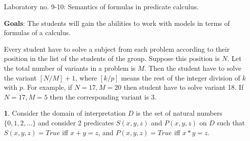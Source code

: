 \documentclass{article}
\begin{document}
\begin{center}
Laboratory no. 9-10: Semantics of formulas in predicate calculus. 
\end{center}

{\bf Goals}: The students will gain the abilities to work with models in terms of formulas of a calculus. 

Every student have to solve a subject from each problem according to their position in the list of the students of the group. Suppose this position is $N$. Let  the total number of variants in a problem is $M$. Then the student have to solve the variant $[N/M]+1$, where $[k/p]$ means the rest of the integer division of $k$ with $p$. For example, if $N=17, M=20$  then student have to solve variant 18. If $N=17, M=5$ then the corresponding variant is 3. 

\bigskip

{\bf 1}. Consider the domain of interpretation $D$ is the set of natural numbers $\{0, 1, 2, \dots\}$ and consider 2 predicates $S(x,y,z)$ and $P(x,y,z)$ on $D$ such that $S(x,y,z) = True$ iff $x+y = z$, and $P(x,y,z) = True$ iff $x*y = z$.  
\end{document}
